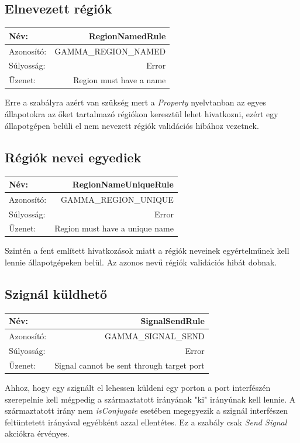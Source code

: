 \subsection{Elnevezett régiók}

\begin{tabular}{ | l | r | }
	\hline
	Név: & RegionNamedRule  \\ 
	\hline
	Azonosító: & GAMMA\_REGION\_NAMED \\
	\hline
	Súlyosság: & Error \\  
	\hline
	Üzenet: & Region must have a name \\
	\hline
\end{tabular}\newline
\newline
Erre a szabályra azért van szükség mert a \emph{Property} nyelvtanban az egyes állapotokra az őket tartalmazó régiókon keresztül lehet hivatkozni, ezért egy állapotgépen belüli el nem nevezett régiók validációs hibához vezetnek.

\subsection{Régiók nevei egyediek}

\begin{tabular}{ | l | r | }
	\hline
	Név: & RegionNameUniqueRule  \\ 
	\hline
	Azonosító: & GAMMA\_REGION\_UNIQUE \\
	\hline
	Súlyosság: & Error \\  
	\hline
	Üzenet: & Region must have a unique name \\
	\hline
\end{tabular}\newline
\newline
Szintén a fent említett hivatkozások miatt a régiók neveinek egyértelműnek kell lennie állapotgépeken belül. Az azonos nevű régiók validációs hibát dobnak.

\subsection{Szignál küldhető}

\begin{tabular}{ | l | r | }
	\hline
	Név: & SignalSendRule  \\ 
	\hline
	Azonosító: & GAMMA\_SIGNAL\_SEND \\
	\hline
	Súlyosság: & Error \\  
	\hline
	Üzenet: & Signal cannot be sent through target port \\
	\hline
\end{tabular}\newline
\newline
Ahhoz, hogy egy szignált el lehessen küldeni egy porton a port interfészén szerepelnie kell mégpedig a származtatott irányának "ki" irányúnak kell lennie. A származtatott irány nem \emph{isConjugate} esetében megegyezik a szignál interfészen feltüntetett irányával egyébként azzal ellentétes. Ez a szabály csak \emph{Send Signal} akciókra érvényes.

